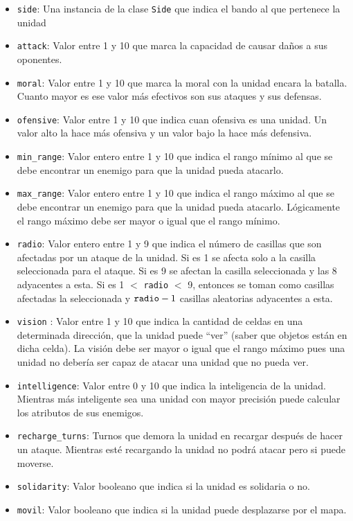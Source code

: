\begin{itemize}
	\item \verb|side|: Una instancia de la clase \verb|Side| que indica el bando al que pertenece la unidad
	\item \verb|attack|: Valor entre 1 y 10 que marca la capacidad de causar daños a sus oponentes.
	\item \verb|moral|: Valor entre 1 y 10 que marca la moral con la unidad encara la batalla. Cuanto mayor es ese valor más efectivos son sus ataques y sus defensas.
	\item \verb|ofensive|: Valor entre 1 y 10 que indica cuan ofensiva es una unidad. Un valor alto la hace más ofensiva y un valor bajo la hace más defensiva.
	\item \verb|min_range|: Valor entero entre 1 y 10 que indica el rango mínimo al que se debe encontrar un enemigo para que la unidad pueda atacarlo.
	\item \verb|max_range|: Valor entero entre 1 y 10 que indica el rango máximo al que se debe encontrar un enemigo para que la unidad pueda atacarlo. L\'ogicamente el rango m\'aximo debe ser mayor o igual que el rango m\'inimo. 
	\item \verb|radio|: Valor entero entre 1 y 9 que indica el número de casillas que son afectadas por un ataque de la unidad. Si es 1 se afecta solo a la casilla seleccionada para el ataque. Si es 9 se afectan la casilla seleccionada y las 8 adyacentes a esta. Si es 1 $<$ \verb|radio| $<$ 9, entonces se toman como casillas afectadas la seleccionada y $\verb|radio|-1$ casillas aleatorias adyacentes a esta.
	\item \verb|vision| : Valor entre 1 y 10 que indica la cantidad de celdas en una determinada dirección, que la unidad puede ``ver'' (saber que objetos están en dicha celda). La visi\'on debe ser mayor o igual que el rango m\'aximo pues una unidad no deber\'ia ser capaz de atacar una unidad que no pueda ver.  
	\item \verb|intelligence|: Valor entre 0 y 10 que indica la inteligencia de la unidad. Mientras más inteligente sea una unidad con mayor precisión puede calcular los atributos de sus enemigos.
	\item \verb|recharge_turns|: Turnos que demora la unidad en recargar después de hacer un ataque. Mientras esté recargando la unidad no podrá atacar pero si puede moverse.
	\item \verb|solidarity|: Valor booleano que indica si la unidad es solidaria o no.
	\item \verb|movil|: Valor booleano que indica si la unidad puede desplazarse por el mapa.  
\end{itemize}

